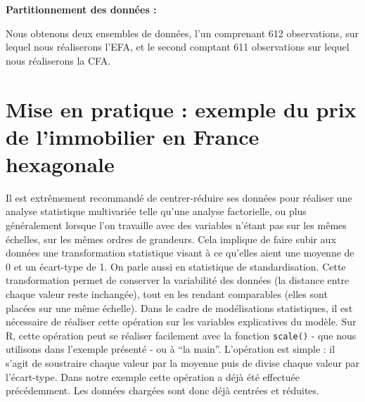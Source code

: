 \documentclass[
  french,
  11pt,
  a4paper,
]{article}
\newenvironment{Shaded}{}{}
\newcommand{\AttributeTok}[1]{\textcolor[rgb]{0.84,0.23,0.29}{#1}}
\newcommand{\CommentTok}[1]{\textcolor[rgb]{0.42,0.45,0.49}{#1}}
\newcommand{\ConstantTok}[1]{\textcolor[rgb]{0.00,0.36,0.77}{#1}}
\newcommand{\DecValTok}[1]{\textcolor[rgb]{0.00,0.36,0.77}{#1}}
\newcommand{\DocumentationTok}[1]{\textcolor[rgb]{0.42,0.45,0.49}{#1}}
\newcommand{\FloatTok}[1]{\textcolor[rgb]{0.00,0.36,0.77}{#1}}
\newcommand{\FunctionTok}[1]{\textcolor[rgb]{0.44,0.26,0.76}{#1}}
\newcommand{\NormalTok}[1]{\textcolor[rgb]{0.14,0.16,0.18}{#1}}
\newcommand{\OtherTok}[1]{\textcolor[rgb]{0.44,0.26,0.76}{#1}}
\newcommand{\SpecialCharTok}[1]{\textcolor[rgb]{0.00,0.36,0.77}{#1}}
\begin{document}
\textbf{Partitionnement des données :}

\begin{Shaded}
\end{Shaded}

Nous obtenons deux ensembles de données, l'un comprenant 612
observations, sur lequel nous réaliserons l'EFA, et le second comptant
611 observations sur lequel nous réaliserons la CFA.

\section{Mise en pratique : exemple du prix de l'immobilier en France
hexagonale}\label{mise-en-pratique-exemple-du-prix-de-limmobilier-en-france-hexagonale}

Il est extrêmement recommandé de centrer-réduire ses données pour
réaliser une analyse statistique multivariée telle qu'une analyse
factorielle, ou plus généralement lorsque l'on travaille avec des
variables n'étant pas sur les mêmes échelles, sur les mêmes ordres de
grandeurs. Cela implique de faire subir aux données une transformation
statistique visant à ce qu'elles aient une moyenne de 0 et un écart-type
de 1. On parle aussi en statistique de standardisation. Cette
transformation permet de conserver la variabilité des données (la
distance entre chaque valeur reste inchangée), tout en les rendant
comparables (elles sont placées sur une même échelle). Dans le cadre de
modélisations statistiques, il est nécessaire de réaliser cette
opération sur les variables explicatives du modèle. Sur R, cette
opération peut se réaliser facilement avec la fonction \texttt{scale()}
- que nous utilisons dans l'exemple présenté - ou à ``la main''.
L'opération est simple : il s'agit de soustraire chaque valeur par la
moyenne puis de divise chaque valeur par l'écart-type. Dans notre
exemple cette opération a déjà été effectuée précédemment. Les données
chargées sont donc déjà centrées et réduites.
\end{document}
